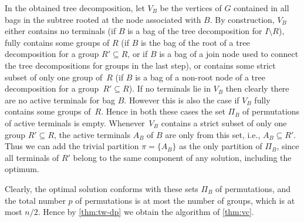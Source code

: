 In the obtained tree decomposition, let $V_B$ be the vertices of $G$ contained in all bags in the subtree rooted at the node associated with $B$. By construction, $V_B$ either contains no terminals 
(if $B$ is a bag of the tree decomposition for $I\setminus R$), 
fully contains some groups of $R$ (if $B$ is the bag of the root of a tree decomposition for a group $R'\subseteq R$, 
or if $B$ is a bag of a join node used to connect the tree decompositions for groups in the last step),
or contains some strict subset of only one group of~$R$
(if $B$ is a bag of a non-root node of a tree decomposition for a group~$R'\subseteq R$). 
If no terminals lie in $V_B$ then clearly there are no active terminals for bag $B$. 
However this is also the case if $V_B$ fully contains some groups of~$R$. Hence in both these cases
the set $\Pi_B$ of permutations of active terminals is empty. 
Whenever~$V_B$ contains a strict subset of only one group $R'\subseteq R$,
the active terminals $A_B$ of $B$ are only from this set, i.e., $A_B\subseteq R'$. Thus we can
add the trivial partition $\pi=\{A_B\}$ as the only partition of $\Pi_B$, since all terminals of $R'$ belong to the same component of any solution, including the optimum. 

Clearly, the optimal solution conforms with these sets $\Pi_B$ of permutations, and the total
number $p$ of permutations is at most the number of groups, which is at most $n/2$.
Hence by \autoref{thm:tw-dp} we obtain the algorithm of \autoref{thm:vc}.

%
